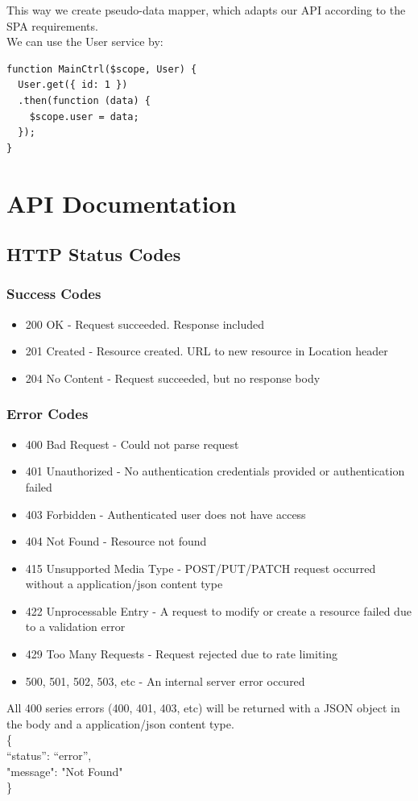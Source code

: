 \documentclass{report}
\begin{document}
This way we create pseudo-data mapper, which adapts our API according to the SPA requirements. \\
We can use the User service by:
\begin{lstlisting}
function MainCtrl($scope, User) {
  User.get({ id: 1 })
  .then(function (data) {
    $scope.user = data;
  });
}
\end{lstlisting}
\section{API Documentation}
\subsection{HTTP Status Codes}
\subsubsection{Success Codes}
\begin{itemize}
\item 200 OK - Request succeeded. Response included
\item 201 Created - Resource created. URL to new resource in Location header
\item 204 No Content - Request succeeded, but no response body
\end{itemize}
\subsubsection{Error Codes}
\begin{itemize}
\item 400 Bad Request - Could not parse request
\item 401 Unauthorized - No authentication credentials provided or authentication failed
\item 403 Forbidden - Authenticated user does not have access
\item 404 Not Found - Resource not found
\item 415 Unsupported Media Type - POST/PUT/PATCH request occurred without a application/json content type
\item 422 Unprocessable Entry - A request to modify or create a resource failed due to a validation error
\item 429 Too Many Requests - Request rejected due to rate limiting
\item 500, 501, 502, 503, etc - An internal server error occured
\end{itemize}
All 400 series errors (400, 401, 403, etc) will be returned with a JSON object in the body and a application/json content type.\\
\{ \\
“status”: “error”, \\
"message": "Not Found" \\
\}
\newpage
\end{document}
